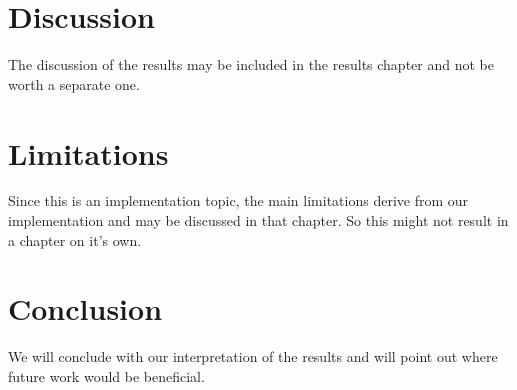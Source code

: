 \documentclass[12pt,twoside]{article}
\theoremstyle{plain}
\theoremstyle{definition}
\theoremstyle{remark}
\begin{document}
\section{Discussion}
\label{sec:discuss}

The discussion of the results may be included in the results chapter and not be worth a separate one. %


\section{Limitations}
\label{sec:limits}

Since this is an implementation topic, the main limitations derive from our implementation and may be discussed in that chapter. So this might not result in a chapter on it's own. %


\section{Conclusion}
\label{sec:concl}

We will conclude with our interpretation of the results and will point out where future work would be beneficial.


%
%
\newpage


\end{document}
